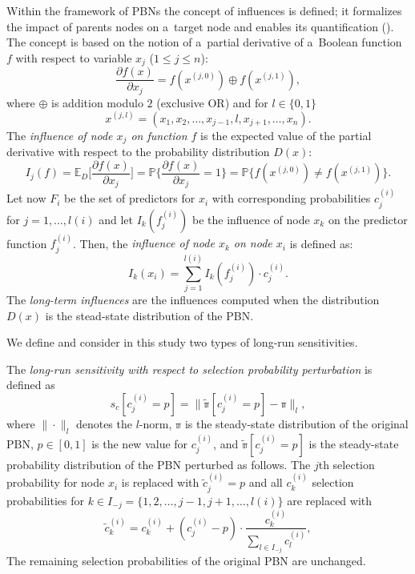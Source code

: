 \documentclass[runningheads,a4paper]{llncs}
\begin{document}
Within the framework of PBNs the concept of influences is defined; it formalizes the impact
of parents nodes on a~target node and enables its quantification (\cite{SDKZ02}). The concept is
based on the notion of a~partial derivative of a~Boolean function $f$ with respect to variable
$x_j$ ($1 \leq j \leq n$):
\begin{equation*}
\frac{\partial f(x)}{\partial x_j} =  f(x^{(j,0)}) \oplus f(x^{(j,1)}),
\end{equation*}
where $\oplus$ is addition modulo $2$ (exclusive OR) and for $l \in \{0,1\}$
\begin{equation*}
x^{(j,l)} = (x_1,x_2,\ldots,x_{j-1},l,x_{j+1},\ldots,x_n).
\end{equation*}
The \emph{influence of node $x_j$ on function $f$} is the expected value of the partial derivative
with respect to the probability distribution $D(x)$:
\begin{equation*}
I_j(f) = \mathbb{E}_D\Big[\frac{\partial f(x)}{\partial x_j}\Big] =
 \mathbb{P}\Big\{\frac{\partial f(x)}{\partial x_j} = 1\Big\} =
 \mathbb{P}\{f(x^{(j,0)}) \neq f(x^{(j,1)})\}.
\end{equation*}
Let now $F_i$ be the set of predictors for $x_i$ with corresponding probabilities $c_j^{(i)}$ for
$j=1,\ldots,l(i)$ and let $I_k(f_j^{(i)})$ be the influence of node $x_k$ on the predictor
function $f_j^{(i)}$. Then, the \emph{influence of node $x_k$ on node $x_i$} is
defined as:
\begin{equation*}
I_k(x_i) = \sum_{j=1}^{l(i)}I_k(f_j^{(i)})\cdot c_j^{(i)}.
\end{equation*}
The \emph{long-term influences} are the influences computed when the distribution $D(x)$ is the
stead-state distribution of the PBN.

We define and consider in this study two types of long-run sensitivities.

\begin{definition}
\label{def:LRS_prob}
The \emph{long-run sensitivity with respect to selection probability perturbation} is defined as
\begin{equation*}
s_c[c_j^{(i)}=p] = \|\mathbb{\tilde{\pi}}[c_j^{(i)}=p] - \mathbb{\pi} \|_l,
\end{equation*}
where $\|\cdot\|_l$ denotes the $l$-norm, $\mathbb{\pi}$ is the steady-state distribution of the
original PBN, $p \in [0,1]$ is the new value for $c_j^{(i)}$, and
$\mathbb{\tilde{\pi}}[c_j^{(i)}=p]$ is the steady-state probability distribution of the PBN
perturbed as follows. The $j$th selection probability for node $x_i$ is replaced with
$\tilde{c}_j^{(i)} = p$ and all $c_k^{(i)}$ selection probabilities for $k \in I_{-j} =
\{1,2,\ldots,j-1,j+1,\dots,l(i)\}$ are replaced with
\begin{equation*}
\tilde{c}_k^{(i)} = c_k^{(i)} + (c_j^{(i)}-p)\cdot\frac{c_k^{(i)}}{\sum_{l\in I_{-j}} c_l^{(i)}},
\end{equation*}
The remaining selection probabilities of the original PBN are unchanged.
\end{definition}
\end{document}
